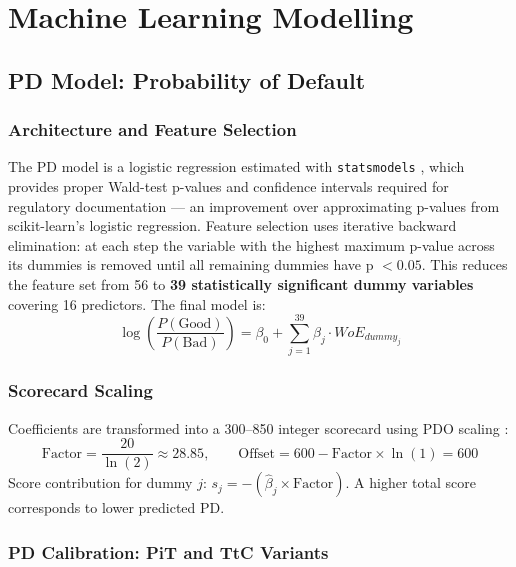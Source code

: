 \documentclass[12pt,a4paper]{report}
\begin{document}
\chapter{Machine Learning Modelling}
\label{ch:models}

\section{PD Model: Probability of Default}

\subsection{Architecture and Feature Selection}

The PD model is a logistic regression estimated with \texttt{statsmodels} \cite{statsmodels}, which provides proper Wald-test p-values and confidence intervals required for regulatory documentation --- an improvement over approximating p-values from scikit-learn's logistic regression. Feature selection uses iterative backward elimination: at each step the variable with the highest maximum p-value across its dummies is removed until all remaining dummies have p $< 0.05$. This reduces the feature set from 56 to \textbf{39 statistically significant dummy variables} covering 16 predictors. The final model is:
\begin{equation}
  \log\!\left(\frac{P(\text{Good})}{P(\text{Bad})}\right) = \beta_0 + \sum_{j=1}^{39} \beta_j \cdot WoE_{dummy_j}
\end{equation}

\subsection{Scorecard Scaling}

Coefficients are transformed into a 300--850 integer scorecard using PDO scaling \cite{siddiqi2006, myfico}:
\begin{equation}
  \text{Factor} = \frac{20}{\ln(2)} \approx 28.85, \qquad \text{Offset} = 600 - \text{Factor} \times \ln(1) = 600
\end{equation}
Score contribution for dummy $j$: $s_j = -(\hat{\beta}_j \times \text{Factor})$. A higher total score corresponds to lower predicted PD.

\subsection{PD Calibration: PiT and TtC Variants}
\end{document}
